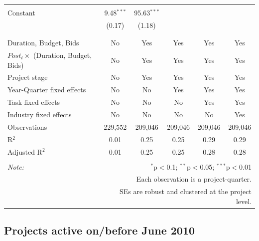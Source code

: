 \documentclass[
]{article}
\begin{document}
\begin{table}[H]
\begin{tabular}{@{\extracolsep{-2pt}}lccccc}
  & & & & & \\ 
 Constant & 9.48$^{***}$ & 95.63$^{***}$ &  &  &  \\ 
  & (0.17) & (1.18) &  &  &  \\ 
  & & & & & \\ 
\hline \\[-1.8ex] 
Duration, Budget, Bids & No & Yes & Yes & Yes & Yes \\ 
$Post_t \times $  (Duration, Budget, Bids) & No & Yes & Yes & Yes & Yes \\ 
Project stage & No & Yes & Yes & Yes & Yes \\ 
Year-Quarter fixed effects & No & No & Yes & Yes & Yes \\ 
Task fixed effects & No & No & No & Yes & Yes \\ 
Industry fixed effects & No & No & No & No & Yes \\ 
Observations & 229,552 & 209,046 & 209,046 & 209,046 & 209,046 \\ 
R$^{2}$ & 0.01 & 0.25 & 0.25 & 0.29 & 0.29 \\ 
Adjusted R$^{2}$ & 0.01 & 0.25 & 0.25 & 0.28 & 0.28 \\ 
\hline 
\hline \\[-1.8ex] 
\textit{Note:}  & \multicolumn{5}{r}{$^{*}$p$<$0.1; $^{**}$p$<$0.05; $^{***}$p$<$0.01} \\ 
 & \multicolumn{5}{r}{Each observation is a project-quarter.} \\ 
 & \multicolumn{5}{r}{SEs are robust and clustered at the project level.} \\ 
\end{tabular} 
\end{table}

\hypertarget{projects-active-onbefore-june-2010-1}{%
\subsection{Projects active on/before June
2010}\label{projects-active-onbefore-june-2010-1}}
\end{document}
